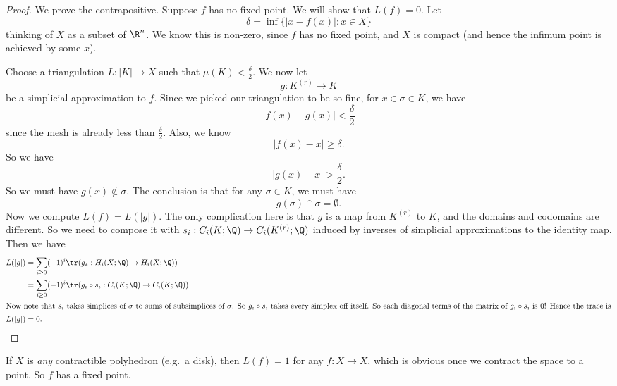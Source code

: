 \documentclass[a4paper]{article}
\begin{document}
\begin{proof}
  We prove the contrapositive. Suppose $f$ has no fixed point. We will show that $L(f) = 0$. Let
  \[
    \delta = \inf \{ |x - f(x)|: x \in X\}
  \]
  thinking of $X$ as a subset of $\R^n$. We know this is non-zero, since $f$ has no fixed point, and $X$ is compact (and hence the infimum point is achieved by some $x$).

  Choose a triangulation $L: |K| \to X$ such that $\mu(K) < \frac{\delta}{2}$. We now let
  \[
    g: K^{(r)} \to K
  \]
  be a simplicial approximation to $f$. Since we picked our triangulation to be so fine, for $x \in \sigma \in K$, we have
  \[
    |f(x) - g(x)| < \frac{\delta}{2}
  \]
  since the mesh is already less than $\frac{\delta}{2}$. Also, we know
  \[
    |f(x) - x| \geq \delta.
  \]
  So we have
  \[
    |g(x) - x| > \frac{\delta}{2}.
  \]
  So we must have $g(x) \not\in \sigma$. The conclusion is that for any $\sigma \in K$, we must have
  \[
    g(\sigma) \cap \sigma = \emptyset.
  \]
  Now we compute $L(f) = L(|g|)$. The only complication here is that $g$ is a map from $K^{(r)}$ to $K$, and the domains and codomains are different. So we need to compose it with $s_i: C_i(K; \Q) \to C_i(K^{(r)}; \Q)$ induced by inverses of simplicial approximations to the identity map. Then we have
  \begin{align*}
    L(|g|) &= \sum_{i \geq 0} (-1)^i \tr(g_*: H_i(X; \Q) \to H_i(X; \Q))\\
    &= \sum_{i \geq 0} (-1)^i \tr(g_i \circ s_i: C_i(K; \Q) \to C_i(K; \Q))\\
    \intertext{Now note that $s_i$ takes simplices of $\sigma$ to sums of subsimplices of $\sigma$. So $g_i \circ s_i$ takes every simplex off itself. So each diagonal terms of the matrix of $g_i \circ s_i$ is $0$! Hence the trace is}
    L(|g|) &= 0.\qedhere
  \end{align*}
\end{proof}

\begin{eg}
  If $X$ is \emph{any} contractible polyhedron (e.g.\ a disk), then $L(f) = 1$ for any $f: X \to X$, which is obvious once we contract the space to a point. So $f$ has a fixed point.
\end{eg}
\end{document}
